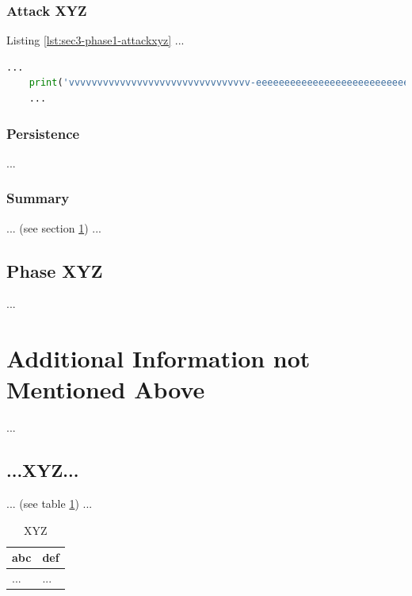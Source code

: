 \subsubsection{Attack XYZ}\label{sec:sec3-phase1-attackxyz}
%
Listing \ref{lst:sec3-phase1-attackxyz} ...\\

\begin{lstlisting}[language=Python,caption={Proof of Concept}, label={lst:sec3-phase1-attackxyz}]
    ...
    print('vvvvvvvvvvvvvvvvvvvvvvvvvvvvvvvv-eeeeeeeeeeeeeeeeeeeeeeeeeeeeeeeeeeeeeeeeeee-looooooooooooooooooooooong-striiiiiiiiiiiiiing')
    ...
\end{lstlisting}
%
%
%
\subsubsection{Persistence}\label{sec:sec3-phase1-pers}
%
...
%
%
%
\subsubsection{Summary}\label{sec:sec3-phase1-sum}
%
... (see section \ref{sec:last}) ...
%
%
%
\subsection{Phase XYZ}\label{sec:sec3-phasexyz}
%
...
%
%
%
\section{Additional Information not Mentioned Above}\label{sec:last}
%
...
%
%
%
\subsection{...XYZ...}\label{sec:last-xyz}
%
... (see table \ref{tbl:last-xyz}) ...

\begin{table}[H]
    \begin{tabularx}{\textwidth}{l|l}
        \textbf{abc} & \textbf{def} \\
        \hline
        ... & ...\\
    \end{tabularx}
    \caption{XYZ\label{tbl:last-xyz}}
\end{table}
%
%
%